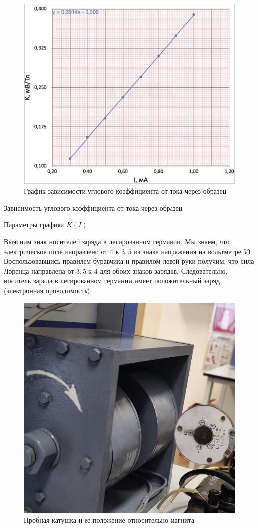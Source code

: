 \documentclass[12pt,a4paper]{article}
\begin{document}
	\begin{figure}[H]
		\includegraphics[width = 10 cm]{src/hallEMF_KI.png}
		\caption{График зависимости углового коэффициента от тока через образец}
	\end{figure}
	
	\begin{table}[h]
		
		\caption{Зависимость углового коэффициента от тока через образец}
	\end{table}
	
	\begin{table}[h]
		\caption{Параметры графика $K(I)$}
		
	\end{table}

	Выясним знак носителей заряда в легированном германии. Мы знаем, что электрическое поле направлено от $4$ к $3,5$ из знака напряжения на вольтметре $V1$. Воспользовавшись правилом буравчика и правилом левой руки получим, что сила Лоренца направлена от $3,5$ к $4$ для обоих знаков зарядов. Следовательно, носитель заряда в легированном германии имеет положительный заряд (электронная проводимость).
	
	\begin{figure}[H]
		\includegraphics[width = 10 cm]{res/probe_coil.jpeg}
		\caption{Пробная катушка и ее положение относительно магнита}
	\end{figure}
	
\end{document}
